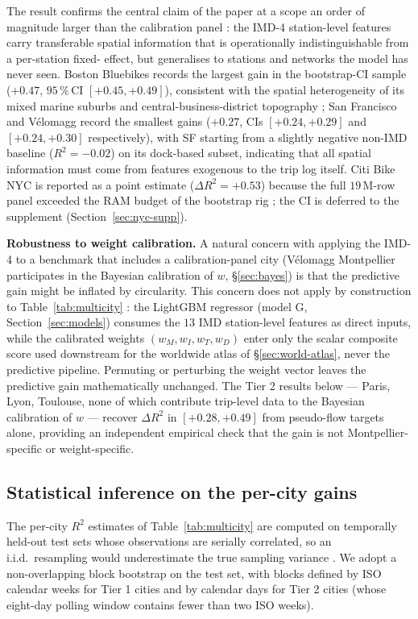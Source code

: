 \documentclass[11pt,a4paper]{article}
\begin{document}
The result confirms the central claim of the paper at a scope an
order of magnitude larger than the calibration panel : the IMD-4
station-level features carry transferable spatial information
that is operationally indistinguishable from a per-station fixed-
effect, but generalises to stations and networks the model has
never seen.  Boston Bluebikes records the largest gain in the
bootstrap-CI sample ($+0.47$, $95\,\%$\,CI $[+0.45, +0.49]$),
consistent with the spatial heterogeneity of its mixed marine
suburbs and central-business-district topography ;
San Francisco and V\'elomagg record the smallest gains
($+0.27$, CIs $[+0.24, +0.29]$ and $[+0.24, +0.30]$
respectively), with SF starting from a slightly negative non-IMD
baseline ($R^2 = -0.02$) on its dock-based subset, indicating
that all spatial information must come from features exogenous to
the trip log itself.  Citi Bike NYC is reported as a point
estimate ($\Delta R^2 = +0.53$) because the full $19$\,M-row
panel exceeded the RAM budget of the bootstrap rig ; the CI is
deferred to the supplement (Section~\ref{sec:nyc-supp}).

\medskip\noindent\textbf{Robustness to weight calibration.}
A natural concern with applying the IMD-4 to a benchmark that
includes a calibration-panel city (V\'elomagg Montpellier
participates in the Bayesian calibration of $w$, §\ref{sec:bayes})
is that the predictive gain might be inflated by circularity.
This concern does not apply by construction to
Table~\ref{tab:multicity} : the LightGBM regressor (model G,
Section~\ref{sec:models}) consumes the $13$ IMD station-level
features as direct inputs, while the calibrated weights
$(w_M, w_I, w_T, w_D)$ enter only the scalar composite score used
downstream for the worldwide atlas of §\ref{sec:world-atlas},
never the predictive pipeline.  Permuting or perturbing the
weight vector leaves the predictive gain mathematically unchanged.
The Tier 2 results below — Paris, Lyon, Toulouse, none of which
contribute trip-level data to the Bayesian calibration of $w$ —
recover $\Delta R^2$ in $[+0.28, +0.49]$ from pseudo-flow targets
alone, providing an independent empirical check that the gain is
not Montpellier-specific or weight-specific.

\subsection{Statistical inference on the per-city gains}
\label{sec:bootstrap}

The per-city $R^2$ estimates of Table~\ref{tab:multicity} are
computed on temporally held-out test sets whose observations are
serially correlated, so an i.i.d.\ resampling would underestimate
the true sampling variance \citep{Carlstein1986,Kunsch1989}.  We
adopt a non-overlapping block bootstrap on the test set, with
blocks defined by ISO calendar weeks for Tier 1 cities and by
calendar days for Tier 2 cities (whose eight-day polling window
contains fewer than two ISO weeks).
\end{document}

